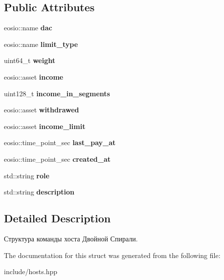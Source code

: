 \subsection*{Public Attributes}
\begin{DoxyCompactItemize}
\item 
\mbox{\label{structdacs_ae9be077b76903051cf3e9fbafe071bda}} 
eosio\+::name {\bfseries dac}
\item 
\mbox{\label{structdacs_a88cfdd3de941fb47f104af9ebc62e51c}} 
eosio\+::name {\bfseries limit\+\_\+type}
\item 
\mbox{\label{structdacs_abd0b1806d25461cd48b36370bb6e7c09}} 
uint64\+\_\+t {\bfseries weight}
\item 
\mbox{\label{structdacs_a8127a0b285195817c1ddfed691d202cb}} 
eosio\+::asset {\bfseries income}
\item 
\mbox{\label{structdacs_a814ea7767e5b315cfc1f3328208e3aba}} 
uint128\+\_\+t {\bfseries income\+\_\+in\+\_\+segments}
\item 
\mbox{\label{structdacs_ad43317ebc8a377915fe01394f74164b8}} 
eosio\+::asset {\bfseries withdrawed}
\item 
\mbox{\label{structdacs_ac0ceba57e94b8f3e70e504d85f1f41cd}} 
eosio\+::asset {\bfseries income\+\_\+limit}
\item 
\mbox{\label{structdacs_abc7762bb445e20f54dc0d447cfc67bce}} 
eosio\+::time\+\_\+point\+\_\+sec {\bfseries last\+\_\+pay\+\_\+at}
\item 
\mbox{\label{structdacs_a64d9fdad557feddad6be7f4feb2954df}} 
eosio\+::time\+\_\+point\+\_\+sec {\bfseries created\+\_\+at}
\item 
\mbox{\label{structdacs_a797a7e46d89522ddb66581320034eb82}} 
std\+::string {\bfseries role}
\item 
\mbox{\label{structdacs_afb89d957d0f8bda654b149bf04627ddf}} 
std\+::string {\bfseries description}
\end{DoxyCompactItemize}


\subsection{Detailed Description}
Структура команды хоста Двойной Спирали. 

The documentation for this struct was generated from the following file\+:\begin{DoxyCompactItemize}
\item 
include/hosts.\+hpp\end{DoxyCompactItemize}
